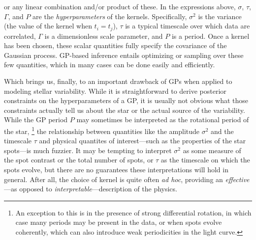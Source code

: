 \documentclass[modern]{aastex62}
\begin{document}
%
or any linear combination and/or product of these. In the expressions above,
$\sigma$, $\tau$, $\Gamma$, and $P$ are
the \emph{hyperparameters} of the kernels.
Specifically, $\sigma^2$ is the variance (the value
of the kernel when $t_i = t_j$), $\tau$ is a typical timescale over which
data are correlated, $\Gamma$ is a dimensionless scale parameter, and $P$ is
a period. Once a kernel has been chosen, these scalar quantities fully
specify the covariance of the Gaussian process. GP-based inference
entails optimizing or sampling over these few quantities, which in many
cases can be done easily and efficiently.

Which brings us, finally, to an important drawback of GPs when applied
to modeling stellar variability. While it is straightforward to derive
posterior constraints on the hyperparameters of a GP, it is usually
not obvious what those constraints actually tell us about the star
or the actual source of the variability. While the GP period $P$
may sometimes be interpreted as the rotational period of the star,%
\footnote{An exception to this is in the presence of strong differential
    rotation, in which case many periods may be present in the data, or
    when spots evolve coherently, which can also introduce weak periodicities
    in the light curve.}
the relationship between quantities like the amplitude $\sigma^2$
and the timescale $\tau$ and physical quantites of interest---such
as the properties of the star spots---is much fuzzier.
It may be tempting to interpret $\sigma^2$ as some measure of the spot
contrast or the total number of spots, or $\tau$ as the timescale on which the
spots evolve, but there are no guarantees these interpretations will
hold in general. After all, the choice of kernel is quite often \emph{ad hoc},
providing an \emph{effective}---as opposed to \emph{interpretable}---description
of the physics.
\end{document}
